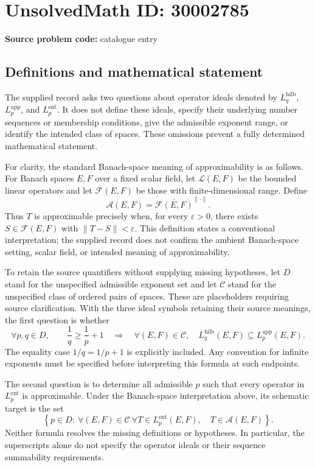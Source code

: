 \documentclass[11pt]{article}
\begin{document}
\section*{UnsolvedMath ID: 30002785}
\textbf{Source problem code:} catalogue entry
\subsection{Definitions and mathematical statement}
The supplied record asks two questions about operator ideals denoted by \(L_q^{\mathrm{hilb}}\), \(L_p^{\mathrm{app}}\), and \(L_p^{\mathrm{ent}}\). It does not define these ideals, specify their underlying number sequences or membership conditions, give the admissible exponent range, or identify the intended class of spaces. These omissions prevent a fully determined mathematical statement.

For clarity, the standard Banach-space meaning of approximability is as follows. For Banach spaces \(E,F\) over a fixed scalar field, let \(\mathcal L(E,F)\) be the bounded linear operators and let \(\mathcal F(E,F)\) be those with finite-dimensional range. Define
\[
\mathcal A(E,F)=\overline{\mathcal F(E,F)}^{\|\cdot\|}.
\]
Thus \(T\) is approximable precisely when, for every \(\varepsilon>0\), there exists \(S\in\mathcal F(E,F)\) with \(\|T-S\|<\varepsilon\). This definition states a conventional interpretation; the supplied record does not confirm the ambient Banach-space setting, scalar field, or intended meaning of approximability.

To retain the source quantifiers without supplying missing hypotheses, let \(D\) stand for the unspecified admissible exponent set and let \(\mathscr C\) stand for the unspecified class of ordered pairs of spaces. These are placeholders requiring source clarification. With the three ideal symbols retaining their source meanings, the first question is whether
\[
\forall p,q\in D,\qquad
\frac1q\geq\frac1p+1
\quad\Longrightarrow\quad
\forall(E,F)\in\mathscr C,\quad
L_q^{\mathrm{hilb}}(E,F)\subseteq L_p^{\mathrm{app}}(E,F).
\]
The equality case \(1/q=1/p+1\) is explicitly included. Any convention for infinite exponents must be specified before interpreting this formula at such endpoints.

The second question is to determine all admissible \(p\) such that every operator in \(L_p^{\mathrm{ent}}\) is approximable. Under the Banach-space interpretation above, its schematic target is the set
\[
\left\{p\in D:\ 
\forall(E,F)\in\mathscr C\ \forall T\in L_p^{\mathrm{ent}}(E,F),\quad
T\in\mathcal A(E,F)\right\}.
\]
Neither formula resolves the missing definitions or hypotheses. In particular, the superscripts alone do not specify the operator ideals or their sequence summability requirements.
\end{document}
